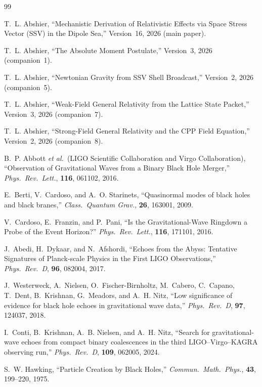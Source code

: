 \documentclass[12pt]{article}
\begin{document}
\begin{thebibliography}{99}

T.~L. Abshier,
``Mechanistic Derivation of Relativistic Effects via Space Stress
Vector (SSV) in the Dipole Sea,''
Version~16, 2026 (main paper).

T.~L. Abshier,
``The Absolute Moment Postulate,''
Version~3, 2026 (companion~1).

T.~L. Abshier,
``Newtonian Gravity from SSV Shell Broadcast,''
Version~2, 2026 (companion~5).

T.~L. Abshier,
``Weak-Field General Relativity from the Lattice State Packet,''
Version~3, 2026 (companion~7).

T.~L. Abshier,
``Strong-Field General Relativity and the CPP Field Equation,''
Version~2, 2026 (companion~8).

B.~P. Abbott \textit{et al.}\ (LIGO Scientific Collaboration and Virgo
Collaboration),
``Observation of Gravitational Waves from a Binary Black Hole Merger,''
\textit{Phys.\ Rev.\ Lett.}, \textbf{116}, 061102, 2016.

E.~Berti, V.~Cardoso, and A.~O. Starinets,
``Quasinormal modes of black holes and black branes,''
\textit{Class.\ Quantum Grav.}, \textbf{26}, 163001, 2009.

V.~Cardoso, E.~Franzin, and P.~Pani,
``Is the Gravitational-Wave Ringdown a Probe of the Event Horizon?''
\textit{Phys.\ Rev.\ Lett.}, \textbf{116}, 171101, 2016.

J.~Abedi, H.~Dykaar, and N.~Afshordi,
``Echoes from the Abyss: Tentative Signatures of Planck-scale Physics
in the First LIGO Observations,''
\textit{Phys.\ Rev.\ D}, \textbf{96}, 082004, 2017.

J.~Westerweck, A.~Nielsen, O.~Fischer-Birnholtz, M.~Cabero, C.~Capano,
T.~Dent, B.~Krishnan, G.~Meadors, and A.~H. Nitz,
``Low significance of evidence for black hole echoes in gravitational
wave data,''
\textit{Phys.\ Rev.\ D}, \textbf{97}, 124037, 2018.

I.~Conti, B.~Krishnan, A.~B. Nielsen, and A.~H. Nitz,
``Search for gravitational-wave echoes from compact binary coalescences
in the third LIGO--Virgo--KAGRA observing run,''
\textit{Phys.\ Rev.\ D}, \textbf{109}, 062005, 2024.

S.~W. Hawking,
``Particle Creation by Black Holes,''
\textit{Commun.\ Math.\ Phys.}, \textbf{43}, 199--220, 1975.


\end{thebibliography}
\end{document}
